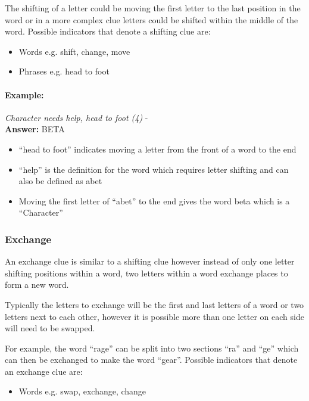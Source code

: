 The shifting of a letter could be moving the first letter to the last position
in the word or in a more complex clue letters could be shifted within the middle
of the word. Possible indicators that denote a shifting clue are:

\begin{itemize} 
  \item Words e.g. shift, change, move 
  \item Phrases e.g. head to foot 
\end{itemize}

\paragraph{Example:} \emph{Character needs help, head to foot (4)} - \citep{shuchiShifting09} \\
\textbf{Answer:} BETA 

\begin{itemize}
  \item ``head to foot'' indicates moving a letter from the front of a word 
        to the end 
  \item ``help'' is the definition for the word which requires letter 
        shifting and can also be defined as abet 
  \item Moving the first letter of ``abet'' to the end gives the word beta 
        which is a ``Character''
\end{itemize}


\subsubsection{Exchange}

An exchange clue is similar to a shifting clue however instead of only one
letter shifting positions within a word, two letters within a word exchange
places to form a new word.

Typically the letters to exchange will be the first and last letters of a word
or two letters next to each other, however it is possible more than one letter
on each side will need to be swapped. 

For example, the word ``rage'' can be split into two sections ``ra'' and ``ge''
which can then be exchanged to make the word ``gear''. Possible  indicators that
denote an exchange clue are:

\begin{itemize} 
  \item Words e.g. swap, exchange, change 
\end{itemize}

